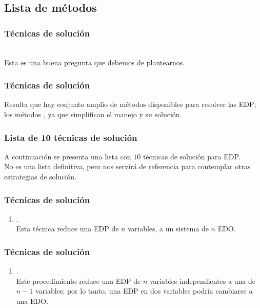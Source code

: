 \documentclass[12pt]{beamer}
\begin{document}
\subsection{Lista de métodos}

\begin{frame}
\frametitle{Técnicas de solución}
\\
\bigskip
\pause
Esta es una buena pregunta que debemos de plantearnos.
\end{frame}
\begin{frame}
\frametitle{Técnicas de solución}
Resulta que hay conjunto amplio de métodos disponibles para resolver las EDP; los métodos , ya que simplifican el manejo y su solución.
\end{frame}
\begin{frame}
\frametitle{Lista de 10 técnicas de solución}
A continuación se presenta una lista con $10$ técnicas de solución para EDP.
\\
\bigskip
\pause
No es una lista definitiva, pero nos servirá de referencia para contemplar otras estrategias de solución.
\end{frame}
\begin{frame}
\frametitle{Técnicas de solución}
\begin{enumerate}
\item {}.
\\
\bigskip
Esta técnica reduce una EDP de $n$ variables, a un sistema de $n$ EDO.
\seti
\end{enumerate}
\end{frame}
\begin{frame}
\frametitle{Técnicas de solución}
\begin{enumerate}
\conti
\item {}. 
\\
\bigskip
Este procedimiento reduce una EDP de $n$ variables independientes a una de $n - 1$ variables; por lo tanto, una EDP en dos variables podría cambiarse a una EDO.
\seti
\end{enumerate}
\end{frame}
\end{document}
